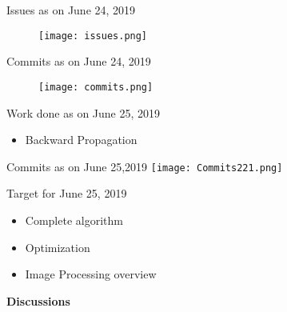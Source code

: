 \documentclass{beamer}
\begin{document}
\begin{frame}{Issues as on June 24, 2019}
    \begin{figure}
        \centering
        \texttt{[image: issues.png]}
    \end{figure}
\end{frame}
    
\begin{frame}{Commits as on June 24, 2019}
    \begin{figure}
        \centering
        \texttt{[image: commits.png]}
    \end{figure}
\end{frame}

\begin{frame}{Work done as on June 25, 2019}
    \begin{itemize}
        \item  Backward Propagation
       
    \end{itemize}
\end{frame}

\begin{frame}{Commits as on June 25,2019}
\texttt{[image: Commits221.png]}
\end{frame}

\begin{frame}{Target for June 25, 2019}
\begin{itemize}
    \item Complete algorithm
    \vspace{10pt}
    \item Optimization
    \vspace{10pt}
    \item Image Processing overview
\end{itemize}
\end{frame}

\begin{frame}{}
  \centering \Large
  \color{blue}
  \textbf {Discussions}
\end{frame}
\end{document}
